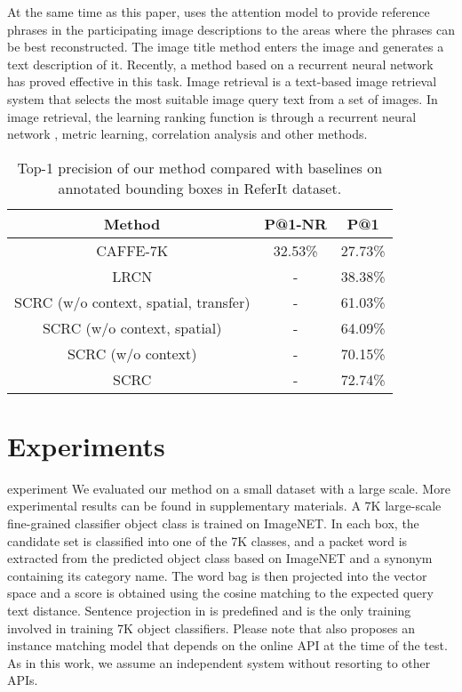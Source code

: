 \documentclass[10pt,twocolumn,letterpaper]{article}
\begin{document}
\par At the same time as this paper, uses the attention model to provide reference phrases in the participating image descriptions to the areas where the phrases can be best reconstructed. The image title method enters the image and generates a text description of it. Recently, a method based on a recurrent neural network \cite{Vinyals_2015_Show}has proved effective in this task. Image retrieval is a text-based image retrieval system that selects the most suitable image query text from a set of images. In image retrieval, the learning ranking function is through a recurrent neural network \cite{Donahue_2015_Long}, metric learning, correlation analysis\cite{Klein_2014_Fisher} and other methods.
\begin{table}[tp]%
	\centering 
	\caption{Top-1 precision of our method compared with baselines
		on annotated bounding boxes in ReferIt dataset.}\label{table1}
		\tabcolsep 0.0001in 
		\begin{tabular} {|c|c|c|}
			\hline
			Method &P@1-NR& P@1  \\
			\hline 
			CAFFE-7K & 32.53\%   &27.73\%   \\
			LRCN &-& 38.38\%  \\
			SCRC (w/o context, spatial, transfer)& - &61.03\% \\
			SCRC (w/o context, spatial)& -& 64.09\%  \\
			SCRC (w/o context)& - &70.15\%   \\
			SCRC& -& 72.74\%   \\
			\hline 
			
		\end{tabular}
	\end{table}
\section{Experiments}
experiment
We evaluated our method on a small dataset with a large scale. More experimental results can be found in supplementary materials. A 7K large-scale fine-grained classifier object class is trained on ImageNET. In each box, the candidate set is classified into one of the 7K classes, and a packet word is extracted from the predicted object class based on ImageNET and a synonym containing its category name. The word bag is then projected into the vector space and a score is obtained using the cosine matching to the expected query text distance. Sentence projection in is predefined and is the only training involved in training 7K object classifiers. Please note that also proposes an instance matching model that depends on the online API at the time of the test. As in this work, we assume an independent system without resorting to other APIs.
\end{document}
